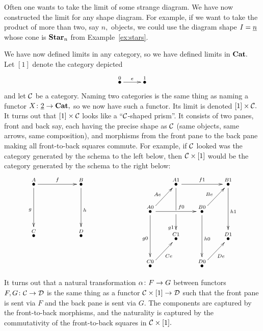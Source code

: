 \documentclass[../main/CT4S-EN-RU]{subfiles}
\begin{document}
\begin{exampleENG}
Often one wants to take the limit of some strange diagram. We have now constructed the limit for any shape diagram. For example, if we want to take the product of more than two, say $n,$ objects, we could use the diagram shape $I=\underline{n}$ whose cone is ${\mathbf{Star}}_n$ from Example~\ref{ex:stars}.
\end{exampleENG}

\begin{exampleRUS}
\end{exampleRUS}

\begin{exampleENG}\label{ex:product version of nat trans}
We have now defined limits in any category, so we have defined limits in ${\mathbf{Cat}}.$ Let $[1]$ denote the category depicted 
$$\xymatrix{\LMO{0}\ar[r]^e&\LMO{1}}$$
and let $\mathcal{C}$ be a category. Naming two categories is the same thing as naming a functor $X\colon\underline{2}\rightarrow{\mathbf{Cat}},$ so we now have such a functor. Its limit is denoted $[1]\times\mathcal{C}.$ It turns out that $[1]\times\mathcal{C}$ looks like a “$\mathcal{C}$-shaped prism”. It consists of two panes, front and back say, each having the precise shape as $\mathcal{C}$ (same objects, same arrows, same composition), and morphisms from the front pane to the back pane making all front-to-back squares commute. For example, if $\mathcal{C}$ looked was the category generated by the schema to the left below, then $\mathcal{C}\times[1]$ would be the category generated by the schema to the right below:
$$
\xymatrix{
\LMO{A}\ar[rr]^f\ar[dd]_g&&\LMO{B}\ar[dd]^h\\\\\LMO{C}&&\LMO{D}
}
\hspace{1in}
\xymatrix@=20pt{
&\LMO{A1}\ar[rr]^{f1}\ar'[d][dd]_(.6){g1}&&\LMO{B1}\ar[dd]^{h1}\\
\LMO{A0}\ar[ur]^{Ae}\ar[rr]^(.6){f0}\ar[dd]_{g0}&&\LMO{B0}\ar[ur]^{Be}\ar[dd]^{h0}\\
&\LMO{C1}&&\LMO{D1}\\
\LMO{C0}\ar[ur]_{Ce}&&\LMO{D0}\ar[ur]_{De}&
}
$$

It turns out that a natural transformation $\alpha\colon F\rightarrow G$ between functors $F,G\colon\mathcal{C}\rightarrow\mathcal{D}$ is the same thing as a functor $\mathcal{C}\times[1]\rightarrow\mathcal{D}$ such that the front pane is sent via $F$ and the back pane is sent via $G.$ The components are captured by the front-to-back morphisms, and the naturality is captured by the commutativity of the front-to-back squares in $\mathcal{C}\times[1].$
\end{exampleENG}
\end{document}
